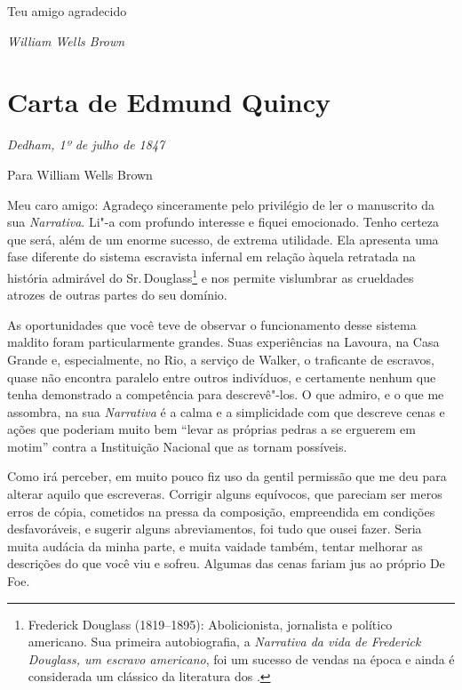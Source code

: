 Teu amigo agradecido

\begin{flushright}
\emph{William Wells Brown}
\end{flushright}

\chapter{Carta de Edmund Quincy} %

\begin{flushright}
\emph{Dedham, 1º de julho de 1847}
\end{flushright}

\begin{flushleft}
Para William Wells Brown
\end{flushleft}

Meu caro amigo: Agradeço sinceramente pelo privilégio de ler o
manuscrito da sua \emph{Narrativa}. Li"-a com profundo interesse e fiquei
emocionado. Tenho certeza que será, além de um enorme sucesso, de
extrema utilidade. Ela apresenta uma fase diferente do sistema
escravista infernal em relação àquela retratada na história admirável do
Sr.\,Douglass\footnote{Frederick Douglass (1819--1895): Abolicionista,
  jornalista e político americano. Sua primeira autobiografia, a
  \emph{Narrativa da vida de Frederick Douglass, um escravo americano},
  foi um sucesso de vendas na época e ainda é considerada um clássico da
  literatura dos .} e nos permite vislumbrar as crueldades atrozes de
outras partes do seu domínio.

As oportunidades que você teve de observar o funcionamento desse sistema
maldito foram particularmente grandes. Suas experiências na Lavoura, na
Casa Grande e, especialmente, no Rio, a serviço de Walker, o traficante
de escravos, quase não encontra paralelo entre outros indivíduos, e
certamente nenhum que tenha demonstrado a competência para descrevê"-los.
O que admiro, e o que me assombra, na sua \emph{Narrativa} é a calma e a
simplicidade com que descreve cenas e ações que poderiam muito bem
``levar as próprias pedras a se erguerem em motim'' contra a Instituição
Nacional que as tornam possíveis.

Como irá perceber, em muito pouco fiz uso da gentil permissão que me deu
para alterar aquilo que escreveras. Corrigir alguns equívocos, que \label{ref1}
pareciam ser meros erros de cópia, cometidos na pressa da composição,
empreendida em condições desfavoráveis, e sugerir alguns abreviamentos,
foi tudo que ousei fazer. Seria muita audácia da minha parte, e muita
vaidade também, tentar melhorar as descrições do que você viu e sofreu.
Algumas das cenas fariam jus ao próprio De Foe.

